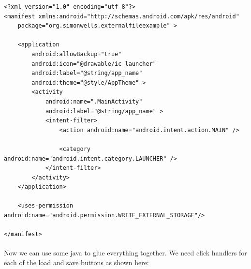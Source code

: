 \begin{lstlisting}
<?xml version="1.0" encoding="utf-8"?>
<manifest xmlns:android="http://schemas.android.com/apk/res/android"
    package="org.simonwells.externalfileexample" >

    <application
        android:allowBackup="true"
        android:icon="@drawable/ic_launcher"
        android:label="@string/app_name"
        android:theme="@style/AppTheme" >
        <activity
            android:name=".MainActivity"
            android:label="@string/app_name" >
            <intent-filter>
                <action android:name="android.intent.action.MAIN" />

                <category android:name="android.intent.category.LAUNCHER" />
            </intent-filter>
        </activity>
    </application>

    <uses-permission android:name="android.permission.WRITE_EXTERNAL_STORAGE"/>

</manifest>
\end{lstlisting}

\paragraph{} Now we can use some java to glue everything together. We need click handlers for each of the load and save buttons as shown here:

